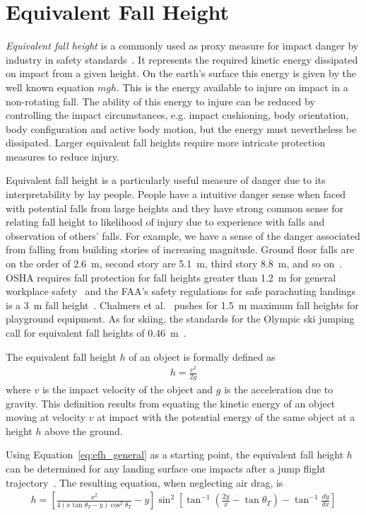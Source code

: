 \documentclass{article}
\begin{document}
\section{Equivalent Fall Height}
%
\emph{Equivalent fall height} is a commonly used as proxy measure for impact
danger by industry in safety standards~\cite{Hubbard2012}. It represents the
required kinetic energy dissipated on impact from a given height. On the
earth's surface this energy is given by the well known equation $mgh$. This is
the energy available to injure on impact in a non-rotating fall. The ability of
this energy to injure can be reduced by controlling the impact circumstances,
e.g. impact cushioning, body orientation, body configuration and active body
motion, but the energy must nevertheless be dissipated. Larger equivalent fall
heights require more intricate protection measures to reduce injury.

Equivalent fall height is a particularly useful measure of danger due to its
interpretability by lay people. People have a intuitive danger sense when faced
with potential falls from large heights and they have strong common sense for
relating fall height to likelihood of injury due to experience with falls and
observation of others' falls. For example, we have a sense of the danger
associated from falling from building stories of increasing magnitude. Ground
floor falls are on the order of 2.6~\si{\meter}, second story are
5.1~\si{\meter}, third story 8.8~\si{\meter}, and so on~\cite{Vish2005}. OSHA
requires fall protection for fall heights greater than 1.2~\si{\meter} for
general workplace safety~ and the FAA's safety regulations
for safe parachuting landings is a 3~\si{\meter} fall height~.  Chalmers et al.~\cite{Chalmers1996} pushes for 1.5~\si{\meter}
maximum fall heights for playground equipment. As for skiing, the standards for
the Olympic ski jumping call for equivalent fall heights of
0.46~\si{\meter}~.

The equivalent fall height $h$ of an object is formally defined as
%
\begin{align}
  h = \frac{v^2}{2g}
  \label{eq:efh_general}
\end{align}
%
where $v$ is the impact velocity of the object and $g$ is the acceleration due
to gravity. This definition results from equating the kinetic energy of an
object moving at velocity $v$ at impact with the potential energy of the same
object at a height $h$ above the ground.

Using Equation~\ref{eq:efh_general} as a starting point, the equivalent fall
height $h$ can be determined for any landing surface one impacts after a jump
flight trajectory~\cite{Hubbard2012}. The resulting equation, when neglecting
air drag, is
%
\begin{align}
  h = \left[\frac{x^2}{4(x\tan\theta_T - y)\cos^{2}\theta_T} -
    y\right]\sin^{2}\left[\tan^{-1}\left(\frac{2y}{x}- \tan\theta_T\right) - \tan^{-1}\frac{dy}{dx}\right]
  \label{eq:efh}
\end{align}
\end{document}
